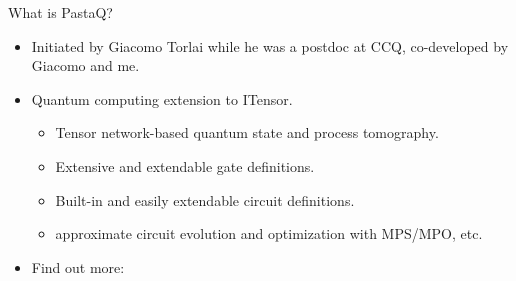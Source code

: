 \begin{frame}{What is PastaQ?}

\begin{itemize}[<+->]

  \item Initiated by Giacomo Torlai while he was a postdoc at CCQ, co-developed by Giacomo and me.
  \item Quantum computing extension to ITensor.

  \begin{itemize}[<+->]

    \item Tensor network-based quantum state and process tomography. 
    \item Extensive and extendable gate definitions.
    \item Built-in and easily extendable circuit definitions.
    \item approximate circuit evolution and optimization with MPS/MPO, etc.

  \end{itemize}

  \item Find out more: 

\end{itemize}

\end{frame}
